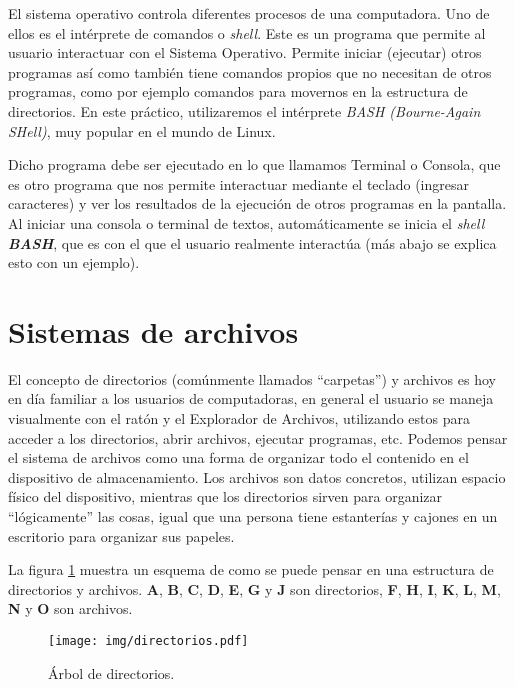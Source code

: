 \documentclass[12pt]{article}
\newcommand{\bash}{\textbf{\emph{BASH}}}
\begin{document}
El sistema operativo controla diferentes procesos de una computadora. Uno de
ellos es el intérprete de comandos o \emph{shell}. Este es un programa que
permite al usuario interactuar con el Sistema Operativo. Permite iniciar
(ejecutar) otros programas así como también tiene comandos propios que no
necesitan de otros programas, como por ejemplo comandos para movernos en la
estructura de directorios. En este práctico, utilizaremos el intérprete
\emph{BASH (Bourne-Again SHell)}, muy popular en el mundo de Linux.

Dicho programa debe ser ejecutado en lo que llamamos Terminal o Consola, que
es otro programa que nos permite interactuar mediante el teclado (ingresar
caracteres) y ver los resultados de la ejecución de otros programas en la
pantalla. Al iniciar una consola o terminal de textos, automáticamente se
inicia el \emph{shell} \bash, que es con el que el usuario realmente
interactúa (más abajo se explica esto con un ejemplo).

\section{Sistemas de archivos}

El concepto de directorios (comúnmente llamados ``carpetas'') y archivos es
hoy en día familiar a los usuarios de computadoras, en general el usuario se
maneja visualmente con el ratón y el Explorador de Archivos, utilizando estos
para acceder a los directorios, abrir archivos, ejecutar programas, etc.
Podemos pensar el sistema de archivos como una forma de organizar todo el
contenido en el dispositivo de almacenamiento. Los archivos son datos
concretos, utilizan espacio físico del dispositivo, mientras que los
directorios sirven para organizar ``lógicamente'' las cosas, igual que una
persona tiene estanterías y cajones en un escritorio para organizar sus
papeles.

La figura \ref{arbolDirectorios} muestra un esquema de como se puede pensar en
una estructura de directorios y archivos. \textbf{A}, \textbf{B}, \textbf{C},
\textbf{D}, \textbf{E}, \textbf{G} y \textbf{J} son directorios, \textbf{F},
\textbf{H}, \textbf{I}, \textbf{K}, \textbf{L}, \textbf{M}, \textbf{N} y
\textbf{O} son archivos.

\begin{figure}[!htb]

    \centering

    \texttt{[image: img/directorios.pdf]}

    \caption{Árbol de directorios.}

    \label{arbolDirectorios}

\end{figure}
\end{document}
